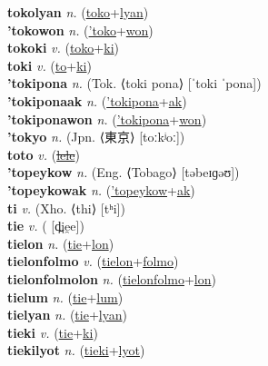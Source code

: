\textbf{tokolyan} \textit{n.} (\hyperref[toko]{toko}+\hyperref[lyan]{lyan})
 \label{tokolyan} \\
\textbf{'tokowon} \textit{n.} (\hyperref['toko]{'toko}+\hyperref[won]{won})
 \label{'tokowon} \\
\textbf{tokoki} \textit{v.} (\hyperref[toko]{toko}+\hyperref[ki]{ki})
 \label{tokoki} \\
\textbf{toki} \textit{v.} (\hyperref[to]{to}+\hyperref[ki]{ki})
 \label{toki} \\
\textbf{'tokipona} \textit{n.} (Tok. ⟨toki pona⟩ [ˈtoki ˈpona])
 \label{'tokipona} \\
\textbf{'tokiponaak} \textit{n.} (\hyperref['tokipona]{'tokipona}+\hyperref[ak]{ak})
 \label{'tokiponaak} \\
\textbf{'tokiponawon} \textit{n.} (\hyperref['tokipona]{'tokipona}+\hyperref[won]{won})
 \label{'tokiponawon} \\
\textbf{'tokyo} \textit{n.} (Jpn. ⟨東京⟩ [toːkʲoː])
 \label{'tokyo} \\
\textbf{toto} \textit{v.} (\hyperref[lele]{\sout{lele}})
 \label{toto} \\
\textbf{'topeykow} \textit{n.} (Eng. ⟨Tobago⟩ [təbeɪɡəʊ])
 \label{'topeykow} \\
\textbf{'topeykowak} \textit{n.} (\hyperref['topeykow]{'topeykow}+\hyperref[ak]{ak})
 \label{'topeykowak} \\
\textbf{ti} \textit{v.} (Xho. ⟨thi⟩ [tʰi])
 \label{ti} \\
\textbf{tie} \textit{v.} ( [d̪ie̯e])
 \label{tie} \\
\textbf{tielon} \textit{n.} (\hyperref[tie]{tie}+\hyperref[lon]{lon})
 \label{tielon} \\
\textbf{tielonfolmo} \textit{v.} (\hyperref[tielon]{tielon}+\hyperref[folmo]{folmo})
 \label{tielonfolmo} \\
\textbf{tielonfolmolon} \textit{n.} (\hyperref[tielonfolmo]{tielonfolmo}+\hyperref[lon]{lon})
 \label{tielonfolmolon} \\
\textbf{tielum} \textit{n.} (\hyperref[tie]{tie}+\hyperref[lum]{lum})
 \label{tielum} \\
\textbf{tielyan} \textit{n.} (\hyperref[tie]{tie}+\hyperref[lyan]{lyan})
 \label{tielyan} \\
\textbf{tieki} \textit{v.} (\hyperref[tie]{tie}+\hyperref[ki]{ki})
 \label{tieki} \\
\textbf{tiekilyot} \textit{n.} (\hyperref[tieki]{tieki}+\hyperref[lyot]{lyot})
 \label{tiekilyot} \\

